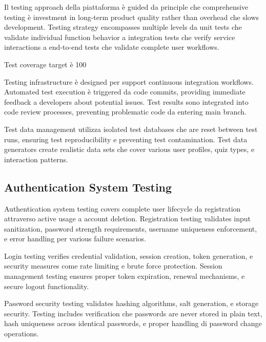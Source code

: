 \documentclass[12pt,a4paper]{article}
\begin{document}
Il testing approach della piattaforma è guided da principle che comprehensive testing è investment in long-term product quality rather than overhead che slows development. Testing strategy encompasses multiple levels da unit tests che validate individual function behavior a integration tests che verify service interactions a end-to-end tests che validate complete user workflows.

Test coverage target è 100%

Testing infrastructure è designed per support continuous integration workflows. Automated test execution è triggered da code commits, providing immediate feedback a developers about potential issues. Test results sono integrated into code review processes, preventing problematic code da entering main branch.

Test data management utilizza isolated test databases che are reset between test runs, ensuring test reproducibility e preventing test contamination. Test data generators create realistic data sets che cover various user profiles, quiz types, e interaction patterns.

\subsection{Authentication System Testing}

Authentication system testing covers complete user lifecycle da registration attraverso active usage a account deletion. Registration testing validates input sanitization, password strength requirements, username uniqueness enforcement, e error handling per various failure scenarios.

Login testing verifies credential validation, session creation, token generation, e security measures come rate limiting e brute force protection. Session management testing ensures proper token expiration, renewal mechanisms, e secure logout functionality.

Password security testing validates hashing algorithms, salt generation, e storage security. Testing includes verification che passwords are never stored in plain text, hash uniqueness across identical passwords, e proper handling di password change operations.
\end{document}

